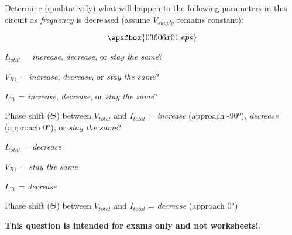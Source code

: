 

Determine (qualitatively) what will happen to the following parameters in this circuit as {\it frequency} is decreased (assume $V_{supply}$ remains constant):

$$\epsfbox{03606x01.eps}$$

$I_{total}$ = {\it increase}, {\it decrease}, or {\it stay the same}?

\vskip 10pt

$V_{R1}$ = {\it increase}, {\it decrease}, or {\it stay the same}? 

\vskip 10pt

$I_{C1}$ = {\it increase}, {\it decrease}, or {\it stay the same}? 

\vskip 10pt

Phase shift ($\Theta$) between $V_{total}$ and $I_{total}$ = {\it increase} (approach -90$^{o}$), {\it decrease} (approach 0$^{o}$), or {\it stay the same}? 







$I_{total}$ = {\it decrease}

\vskip 10pt

$V_{R1}$ = {\it stay the same} 

\vskip 10pt

$I_{C1}$ = {\it decrease}

\vskip 10pt

Phase shift ($\Theta$) between $V_{total}$ and $I_{total}$ = {\it decrease} (approach 0$^{o}$)







{\bf This question is intended for exams only and not worksheets!}.



